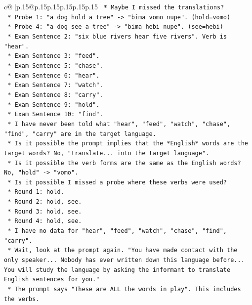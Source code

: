 \documentclass{article}
\begin{document}
{\begin{supertabular}{c@{$\;$}|p{.15\linewidth}@{}p{.15\linewidth}p{.15\linewidth}p{.15\linewidth}p{.15\linewidth}p{.15\linewidth}}
{{{\texttt{    *   Maybe I missed the translations?} \\
\texttt{        *   Probe 1: "a dog hold a tree" {-}> "bima vomo nupe". (hold=vomo)} \\
\texttt{        *   Probe 4: "a dog see a tree" {-}> "bima hebi nupe". (see=hebi)} \\
\texttt{        *   Exam Sentence 2: "six blue rivers hear five rivers". Verb is "hear".} \\
\texttt{        *   Exam Sentence 3: "feed".} \\
\texttt{        *   Exam Sentence 5: "chase".} \\
\texttt{        *   Exam Sentence 6: "hear".} \\
\texttt{        *   Exam Sentence 7: "watch".} \\
\texttt{        *   Exam Sentence 8: "carry".} \\
\texttt{        *   Exam Sentence 9: "hold".} \\
\texttt{        *   Exam Sentence 10: "find".} \\
\texttt{    *   I have never been told what "hear", "feed", "watch", "chase", "find", "carry" are in the target language.} \\
\texttt{    *   Is it possible the prompt implies that the *English* words are the target words? No, "translate... into the target language".} \\
\texttt{    *   Is it possible the verb forms are the same as the English words? No, "hold" {-}> "vomo".} \\
\texttt{    *   Is it possible I missed a probe where these verbs were used?} \\
\texttt{        *   Round 1: hold.} \\
\texttt{        *   Round 2: hold, see.} \\
\texttt{        *   Round 3: hold, see.} \\
\texttt{        *   Round 4: hold, see.} \\
\texttt{    *   I have no data for "hear", "feed", "watch", "chase", "find", "carry".} \\
\texttt{    *   Wait, look at the prompt again. "You have made contact with the only speaker... Nobody has ever written down this language before... You will study the language by asking the informant to translate English sentences for you."} \\
\texttt{    *   The prompt says "These are ALL the words in play". This includes the verbs.} \\
}}}
\end{supertabular}}
\end{document}
